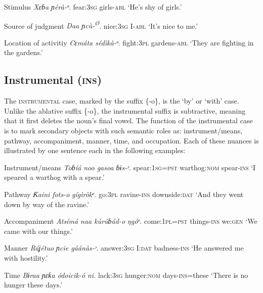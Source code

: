 Stimulus
\textit{Xɛɓa     ɲérà-}\textit{ᵒ}.
fear:\textsc{3sg}   girls-\textsc{abl}
‘He’s shy of girls.’




Source of judgment
\textit{Daa     ɲcù-}\textit{\textsuperscript{Ø}}.
nice:\textsc{3sg}   I-\textsc{abl}
‘It’s nice to me.’




Location of activitiy
\textit{Cɛmáta   sédìkà-}\textit{ᵒ}.
fight:\textsc{3pl}   gardens-\textsc{abl}
‘They are fighting in the gardens.’






\subsection{Instrumental (\textsc{ins})}


The \textsc{instrumental} case, marked by the suffix \{-o\}, is the ‘by’ or ‘with’ case. Unlike the ablative suffix \{-o\}, the instrumental suffix is subtractive, meaning that it first deletes the noun’s final vowel. The function of the instrumental case is to mark secondary objects with such semantic roles as: instrument/means, pathway, accompaniment, manner, time, and occupation. Each of these nuances is illustrated by one sentence each in the following examples:




Instrument/means
\textit{Toɓíá   noo     gasoa       ɓɨs-}\textit{ᵓ}.
spear:\textsc{1sg}=\textsc{pst}   warthog:\textsc{nom}   spear-\textsc{ins}
‘I speared a warthog with a spear.’




Pathway
\textit{Ƙaini     fots-}\textit{o}\textit{     gígìròkᵉ.}
go:\textsc{3pl}   ravine-\textsc{ins}   downside:\textsc{dat}
‘And they went down by way of the ravine.’



Accompaniment
\textit{Atsímá naa     kúrúɓád-}\textit{o}\textit{   ŋgóᵉ.}
come:\textsc{1pl}=\textsc{pst}   things-\textsc{ins}   we:\textsc{gen}
‘We came with our things.’




Manner
\textit{Ráʝétuo   ɲcie   gáánàs-}\textit{ᵓ}.
answer:\textsc{3sg}   I:\textsc{dat}   badness-\textsc{ins}
‘He answered me with hostility.’




Time
\textit{Bɨraa     ɲɛƙa     ódoicik-}\textit{ó}\textit{ ni.}
lack:\textsc{3sg}   hunger:\textsc{nom}   days-\textsc{ins}=these
‘There is no hunger these days.’




